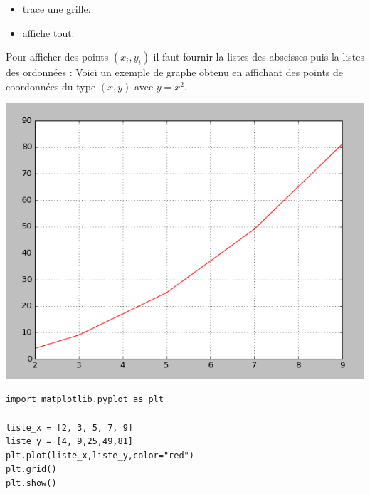 \documentclass[11pt,class=report,crop=false]{standalone}
\begin{document}
\begin{cours}
\begin{itemize}
  \item {} trace une grille.
  
  \item {} affiche tout.  
  
\end{itemize}

\bigskip

Pour afficher des points $(x_i,y_i)$ il faut fournir la listes des abscisses puis la listes des ordonnées :
Voici un exemple de graphe obtenu en affichant des points de coordonnées du type $(x,y)$ avec $y = x^2$.

\begin{center}
\includegraphics[scale=\myscale,scale=0.45]{ecran-liste-cours-visualisation-bis}
\end{center}


\begin{lstlisting}
import matplotlib.pyplot as plt

liste_x = [2, 3, 5, 7, 9]
liste_y = [4, 9,25,49,81]
plt.plot(liste_x,liste_y,color="red")
plt.grid()
plt.show()
\end{lstlisting}

\end{cours}


\end{document}
